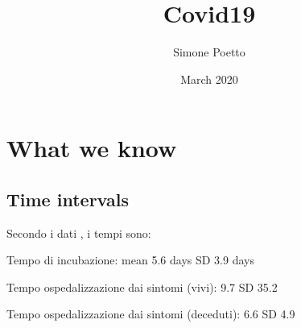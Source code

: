 \documentclass{article}
\title{Covid19}
\author{Simone Poetto }
\date{March 2020}
\begin{document}
\maketitle

\section{What we know}
\subsection{Time intervals}
Secondo i dati \cite{Linton}, i tempi sono:

Tempo di incubazione: mean 5.6 days SD 3.9 days

Tempo ospedalizzazione dai sintomi (vivi): 9.7 SD 35.2

Tempo ospedalizzazione dai sintomi (deceduti): 6.6 SD 4.9








\end{document}
